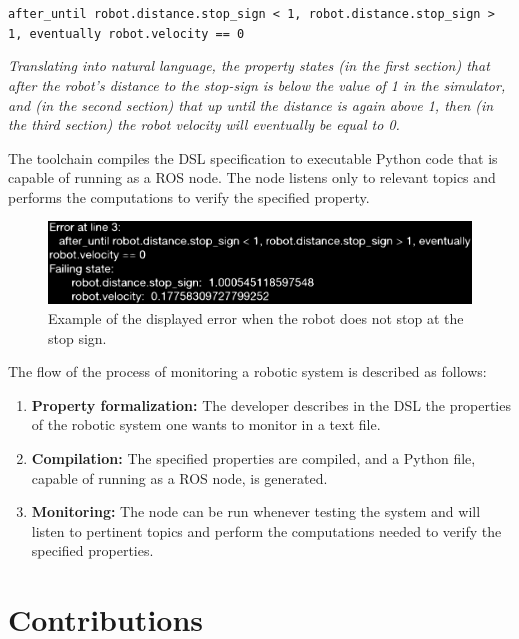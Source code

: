 \texttt{after\_until robot.distance.stop\_sign < 1, robot.distance.stop\_sign > 1, eventually robot.velocity == 0}

\textit{Translating into natural language, the property states (in the first section) that after the robot's distance to the stop-sign is below the value of 1 in the simulator, and (in the second section) that up until the distance is again above 1, then (in the third section) the robot velocity will eventually be equal to 0.}

The toolchain compiles the DSL specification to executable Python code that is capable of running as a ROS node. The node listens only to relevant topics and performs the computations to verify the specified property.

\begin{figure}[htb]
\includegraphics[width=\textwidth]{images/error.eps}
\caption{Example of the displayed error when the robot does not stop at the stop sign.} \label{fig:error}
\end{figure}

The flow of the process of monitoring a robotic system is described as follows:

\begin{enumerate}[label=(\roman*)]
    \item \textbf{Property formalization:} The developer describes in the DSL the properties of the robotic system one wants to monitor in a text file.
    \item \textbf{Compilation:} The specified properties are compiled, and a Python file, capable of running as a ROS node, is generated.
    \item \textbf{Monitoring:} The node can be run whenever testing the system and will listen to pertinent topics and perform the computations needed to verify the specified properties.
\end{enumerate}


\section{Contributions}
\label{sec:contributions}


